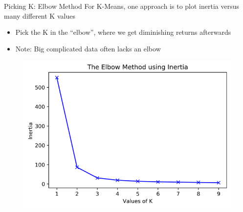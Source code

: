 \documentclass[aspectratio=169]{../latex_main/tntbeamer}  %
\begin{document}
	
	\begin{frame}{Picking K: Elbow Method}
	    For K-Means, one approach is to plot inertia versus many different K values
	    \begin{itemize}
	        \item Pick the K in the “elbow”, where we get diminishing returns afterwards
	        \item Note: Big complicated data often lacks an elbow
	    \end{itemize}
	    \begin{figure}
	        \centering
	        \includegraphics[scale=.65]{Bild56}
	    \end{figure}
	\end{frame}
	
	
	
\end{document}
